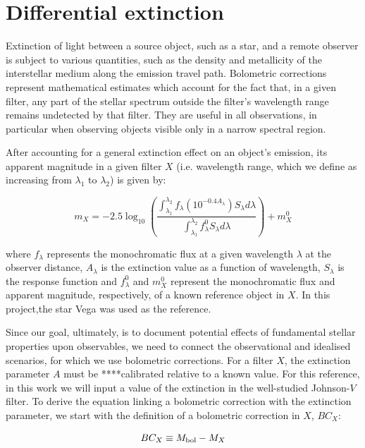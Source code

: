 \documentclass[12pt, a4paper]{report}
\begin{document}
\section{Differential extinction}
Extinction of light between a source object, such as a star, and a remote observer is subject to various quantities, such as the density and metallicity of the interstellar medium along the emission travel path. Bolometric corrections represent mathematical estimates which account for the fact that, in a given filter, any part of the stellar spectrum outside the filter's wavelength range remains undetected by that filter. They are useful in all observations, in particular when observing objects visible only in a narrow spectral region.

After accounting for a general extinction effect on an object's emission, its apparent magnitude in a given filter $X$ (i.e. wavelength range, which we define as increasing from $\lambda _{1}$ to $\lambda _{2}$) is given by:

\begin{equation}
m_{X} = -2.5 \log_{10} \left(\frac{ \int_{\lambda_{1}}^{\lambda_{2}} f_{\lambda} \left( 10^{-0.4 A_{\lambda}} \right) S_{\lambda} d\lambda }{ \int_{\lambda_{1}}^{\lambda_{2}} f_{\lambda}^{0} S_{\lambda} d\lambda }\right) + m_{X}^{0}
\label{app_mag_def}
\end{equation}

where $f_{\lambda}$ represents the monochromatic flux at a given wavelength $\lambda$ at the observer distance, $A_{\lambda}$ is the extinction value as a function of wavelength, $S_{\lambda}$ is the response function and $f_{\lambda}^{0}$ and $m_{X}^{0}$ represent the monochromatic flux and apparent magnitude, respectively, of a known reference object in $X$. In this project,the star Vega was used as the reference.

Since our goal, ultimately, is to document potential effects of fundamental stellar properties upon observables, we need to connect the observational and idealised scenarios, for which we use bolometric corrections. For a filter $X$, the extinction parameter $A$ must be ****calibrated relative to a known value. For this reference, in this work we will input a value of the extinction in the well-studied Johnson-$V$ filter.
To derive the equation linking a bolometric correction with the extinction parameter, we start with the definition of a bolometric correction in $X$, $BC_{X}$:

\begin{equation}
BC_{X} \equiv M_{\textnormal{bol}} - M_{X}
\label{BC_def}
\end{equation}
\end{document}
